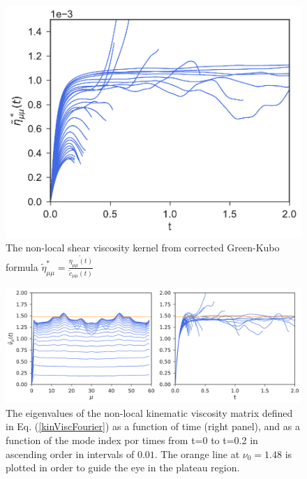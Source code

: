 \documentclass[a4paper,openright,12pt]{book}
\begin{document}
\begin{figure}[h!]
  \centering
\includegraphics[scale=0.45]{EtaStartFourier-PBC}
\caption[The non-local shear viscosity kernel for PBC system]{The non-local shear viscosity kernel from corrected Green-Kubo formula $\tilde{\eta}^*_{\mu\mu}=\frac{\tilde{\eta_{\mu\mu}(t)}}{\tilde{c}_{\mu\mu}(t)}$}
\label{fig:EtaStartFourier-PBC}
\end{figure}
\begin{figure}[h!]
  \centering
\includegraphics[scale=0.45]{KinVisctFourier-PBC}
\caption[The eigenvalues of the non-local kinematic viscosity matrix for PBC system]{The eigenvalues of the non-local kinematic viscosity matrix defined in Eq. (\ref{kinViscFourier}) as a function of time (right panel), and as a function of the mode index por times from t=0 to t=0.2 in ascending order in intervals of $0.01$. The orange line at $\nu_0=1.48$ is plotted in order to guide the eye in the plateau region.}
\label{fig:KinVisctFourier-PBC}
\end{figure}

\newpage
\end{document}
